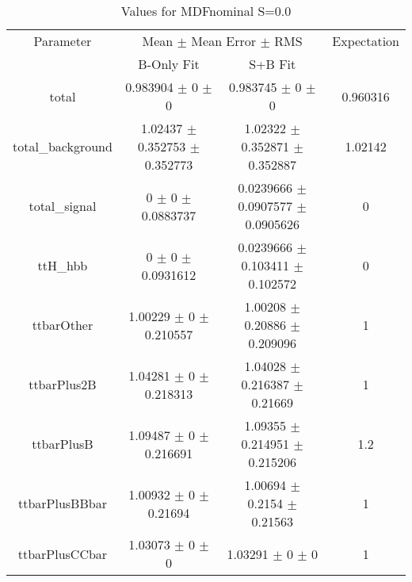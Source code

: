 \begin{table}
\centering
\caption{Values for MDFnominal S=0.0}
\begin{tabular}{cccc}
\toprule
Parameter & \multicolumn{2}{c}{Mean $\pm$ Mean Error $\pm$ RMS} & Expectation\\
 & B-Only Fit & S+B Fit & \\
\midrule
total & \num{0.983904} $\pm$ \num{0} $\pm$ \num{0} & \num{0.983745} $\pm$ \num{0} $\pm$ \num{0} & \num{0.960316}\\
total\_background & \num{1.02437} $\pm$ \num{0.352753} $\pm$ \num{0.352773} & \num{1.02322} $\pm$ \num{0.352871} $\pm$ \num{0.352887} & \num{1.02142}\\
total\_signal & \num{0} $\pm$ \num{0} $\pm$ \num{0.0883737} & \num{0.0239666} $\pm$ \num{0.0907577} $\pm$ \num{0.0905626} & \num{0}\\
ttH\_hbb & \num{0} $\pm$ \num{0} $\pm$ \num{0.0931612} & \num{0.0239666} $\pm$ \num{0.103411} $\pm$ \num{0.102572} & \num{0}\\
ttbarOther & \num{1.00229} $\pm$ \num{0} $\pm$ \num{0.210557} & \num{1.00208} $\pm$ \num{0.20886} $\pm$ \num{0.209096} & \num{1}\\
ttbarPlus2B & \num{1.04281} $\pm$ \num{0} $\pm$ \num{0.218313} & \num{1.04028} $\pm$ \num{0.216387} $\pm$ \num{0.21669} & \num{1}\\
ttbarPlusB & \num{1.09487} $\pm$ \num{0} $\pm$ \num{0.216691} & \num{1.09355} $\pm$ \num{0.214951} $\pm$ \num{0.215206} & \num{1.2}\\
ttbarPlusBBbar & \num{1.00932} $\pm$ \num{0} $\pm$ \num{0.21694} & \num{1.00694} $\pm$ \num{0.2154} $\pm$ \num{0.21563} & \num{1}\\
ttbarPlusCCbar & \num{1.03073} $\pm$ \num{0} $\pm$ \num{0} & \num{1.03291} $\pm$ \num{0} $\pm$ \num{0} & \num{1}\\
\bottomrule
\end{tabular}
\end{table}
